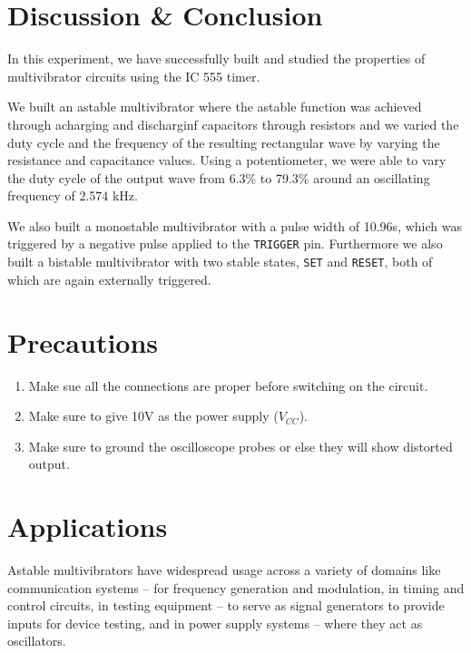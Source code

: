 \section{Discussion \& Conclusion}
In this experiment, we have successfully built and studied the properties of multivibrator circuits using the IC 555 timer.

We built an astable multivibrator where the astable function was achieved through acharging and discharginf capacitors through resistors and we varied the duty cycle and the frequency of the resulting rectangular wave by varying the resistance and capacitance values.
Using a potentiometer, we were able to vary the duty cycle of the output wave from 6.3\% to 79.3\% around an oscillating frequency of 2.574 kHz.

We also built a monostable multivibrator with a pulse width of 10.96s, which was triggered by a negative pulse applied to the \verb|TRIGGER| pin. Furthermore we also built a bistable multivibrator with two stable states, \verb|SET| and \verb|RESET|, both of which are again externally triggered.

\section{Precautions}

\begin{enumerate}
    \item Make sue all the connections are proper before switching on the circuit.
    \item Make sure to give 10V as the power supply ($V_{CC}$).
    \item Make sure to ground the oscilloscope probes or else they will show distorted output.
\end{enumerate}

\section{Applications}
Astable multivibrators have widespread usage across a variety of domains like
communication systems -- for frequency generation and modulation, 
in timing and control circuits, in
testing equipment -- to serve as signal generators to provide inputs for device testing, and in power supply systems -- where they act as oscillators.
